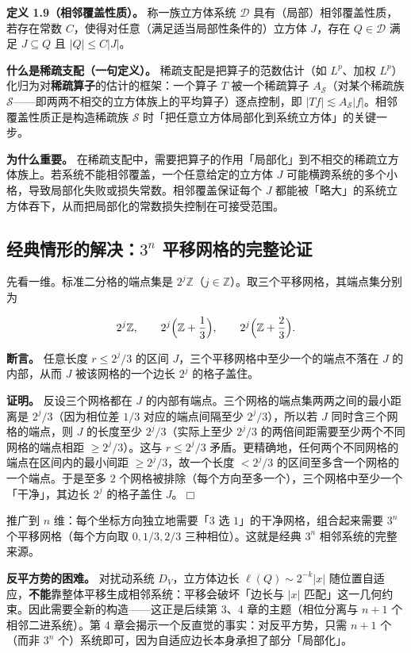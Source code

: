\documentclass[a4paper,11pt,openany]{ctexbook}
\numberwithin{equation}{chapter}
\numberwithin{figure}{chapter}
\numberwithin{table}{chapter}
\begin{document}
\textbf{定义 1.9（相邻覆盖性质）。} 称一族立方体系统 $\mathcal D$ 具有（局部）相邻覆盖性质，若存在常数 $C$，使得对任意（满足适当局部性条件的）立方体 $J$，存在 $Q\in\mathcal D$ 满足 $J\subseteq Q$ 且 $|Q|\le C|J|$。

\textbf{什么是稀疏支配（一句定义）。} 稀疏支配是把算子的范数估计（如 $L^p$、加权 $L^p$）化归为对\textbf{稀疏算子}的估计的框架：一个算子 $T$ 被一个稀疏算子 $A_{\mathcal S}$（对某个稀疏族 $\mathcal S$——即两两不相交的立方体族上的平均算子）逐点控制，即 $|Tf|\lesssim A_{\mathcal S}|f|$。相邻覆盖性质正是构造稀疏族 $\mathcal S$ 时「把任意立方体局部化到系统立方体」的关键一步。

\textbf{为什么重要。} 在稀疏支配中，需要把算子的作用「局部化」到不相交的稀疏立方体族上。若系统不能相邻覆盖，一个任意给定的立方体 $J$ 可能横跨系统的多个小格，导致局部化失败或损失常数。相邻覆盖保证每个 $J$ 都能被「略大」的系统立方体吞下，从而把局部化的常数损失控制在可接受范围。

\subsection{经典情形的解决：$3^n$ 平移网格的完整论证}

先看一维。标准二分格的端点集是 $2^j\mathbb Z$（$j\in\mathbb Z$）。取三个平移网格，其端点集分别为

$$2^j\mathbb Z,\qquad 2^j\Bigl(\mathbb Z+\frac13\Bigr),\qquad 2^j\Bigl(\mathbb Z+\frac23\Bigr).$$

\textbf{断言。} 任意长度 $r\le 2^j/3$ 的区间 $J$，三个平移网格中至少一个的端点不落在 $J$ 的内部，从而 $J$ 被该网格的一个边长 $2^j$ 的格子盖住。

\textbf{证明。} 反设三个网格都在 $J$ 的内部有端点。三个网格的端点集两两之间的最小距离是 $2^j/3$（因为相位差 $1/3$ 对应的端点间隔至少 $2^j/3$），所以若 $J$ 同时含三个网格的端点，则 $J$ 的长度至少 $2^j/3$（实际上至少 $2^j/3$ 的两倍间距需要至少两个不同网格的端点相距 $\ge 2^j/3$）。这与 $r\le 2^j/3$ 矛盾。更精确地，任何两个不同网格的端点在区间内的最小间距 $\ge 2^j/3$，故一个长度 $<2^j/3$ 的区间至多含一个网格的一个端点。于是至多 $2$ 个网格被排除（每个方向至多一个），三个网格中至少一个「干净」，其边长 $2^j$ 的格子盖住 $J$。$\Box$

推广到 $n$ 维：每个坐标方向独立地需要「$3$ 选 $1$」的干净网格，组合起来需要 $3^n$ 个平移网格（每个方向取 $0,1/3,2/3$ 三种相位）。这就是经典 $3^n$ 相邻系统的完整来源。

\textbf{反平方势的困难。} 对扰动系统 $D_V$，立方体边长 $\ell(Q)\sim2^{-k}|x|$ 随位置自适应，\textbf{不能}靠整体平移生成相邻系统：平移会破坏「边长与 $|x|$ 匹配」这一几何约束。因此需要全新的构造——这正是后续第 3、4 章的主题（相位分离与 $n+1$ 个相邻二进系统）。第 4 章会揭示一个反直觉的事实：对反平方势，只需 $n+1$ 个（而非 $3^n$ 个）系统即可，因为自适应边长本身承担了部分「局部化」。
\end{document}
